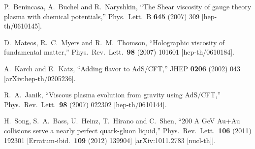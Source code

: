 \begin{thebibliography}{99}
  P.~Benincasa, A.~Buchel and R.~Naryshkin,
  ``The Shear viscosity of gauge theory plasma with chemical potentials,''
  Phys.\ Lett.\ B {\bf 645} (2007) 309
  [hep-th/0610145].


  D.~Mateos, R.~C.~Myers and R.~M.~Thomson,
  ``Holographic viscosity of fundamental matter,''
  Phys.\ Rev.\ Lett.\  {\bf 98} (2007) 101601
  [hep-th/0610184].

  A.~Karch and E.~Katz,
  ``Adding flavor to AdS/CFT,''
  JHEP {\bf 0206} (2002) 043
  [arXiv:hep-th/0205236].


  R.~A.~Janik,
  ``Viscous plasma evolution from gravity using AdS/CFT,''
  Phys.\ Rev.\ Lett.\  {\bf 98} (2007) 022302
  [hep-th/0610144].

  

    

  

  H.~Song, S.~A.~Bass, U.~Heinz, T.~Hirano and C.~Shen,
  ``200 A GeV Au+Au collisions serve a nearly perfect quark-gluon liquid,''
  Phys.\ Rev.\ Lett.\  {\bf 106} (2011) 192301
   [Erratum-ibid.\  {\bf 109} (2012) 139904]
  [arXiv:1011.2783 [nucl-th]].


\end{thebibliography}
